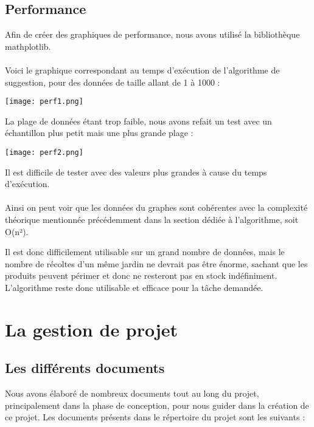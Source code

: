 \documentclass[12pt,titlepage]{report}
\begin{document}
\section{Performance}

Afin de créer des graphiques de performance, nous avons utilisé la bibliothèque mathplotlib. \\ \\
Voici le graphique correspondant au temps d’exécution de l’algorithme de suggestion, pour des données de taille allant de 1 à 1000 :

\begin{center}
     \texttt{[image: perf1.png]} 
\end{center}


La plage de données étant trop faible, nous avons refait un test avec un échantillon plus petit mais une plus grande plage :

\begin{center}
     \texttt{[image: perf2.png]} 
\end{center}

Il est difficile de tester avec des valeurs plus grandes à cause du temps d’exécution. \\ \\
Ainsi on peut voir que les données du graphes sont cohérentes avec la complexité théorique mentionnée précédemment dans la section dédiée à l’algorithme, soit O(n²).

Il est donc difficilement utilisable sur un grand nombre de données, mais le nombre de récoltes d'un même jardin ne devrait pas être énorme, sachant que les produits peuvent périmer et donc ne resteront pas en stock indéfiniment. L'algorithme reste donc utilisable et efficace pour la tâche demandée.



\chapter{La gestion de projet}

\section{Les différents documents}

Nous avons élaboré de nombreux documents tout au long du projet, principalement dans la phase de conception, pour nous guider dans la création de ce projet. Les documents présents dans le répertoire du projet sont les suivants :  \\
\end{document}
